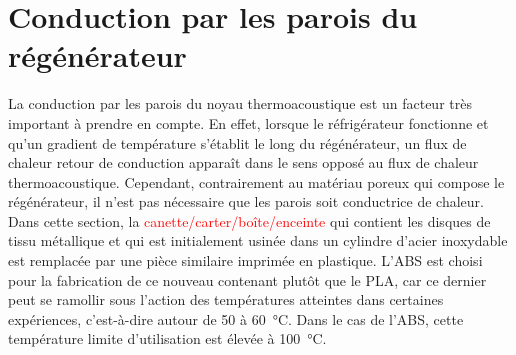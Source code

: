 \section{Conduction par les parois du régénérateur}
La conduction par les parois du noyau thermoacoustique est un facteur très important à prendre en compte. En effet, lorsque le réfrigérateur fonctionne et qu'un gradient de température s'établit le long du régénérateur, un flux de chaleur \og retour \fg{} de conduction apparaît dans le sens opposé au flux de chaleur thermoacoustique. Cependant, contrairement au matériau poreux qui compose le régénérateur, il n'est pas nécessaire que les parois soit conductrice de chaleur. Dans cette section, la \textcolor{red}{canette/carter/boîte/enceinte} qui contient les disques de tissu métallique et qui est initialement usinée dans un cylindre d'acier inoxydable est remplacée par une pièce similaire imprimée en plastique. L'ABS est choisi pour la fabrication de ce nouveau contenant plutôt que le PLA, car ce dernier peut se ramollir sous l'action des températures atteintes dans certaines expériences, c'est-à-dire autour de \num{50} à \qty{60}{\degreeCelsius}. Dans le cas de l'ABS, cette température limite d'utilisation est élevée à \qty{100}{\degreeCelsius}.

